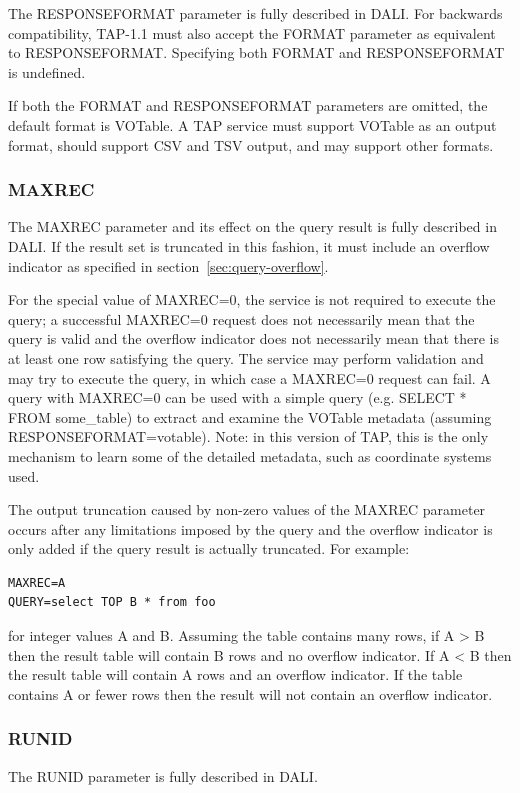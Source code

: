 \documentclass[11pt,letter]{ivoa}
\begin{document}
The RESPONSEFORMAT parameter is fully described in DALI. For 
backwards 
compatibility, TAP-1.1 must also accept the FORMAT parameter as equivalent to 
RESPONSEFORMAT.  
Specifying both FORMAT and RESPONSEFORMAT is undefined.

If both the FORMAT and RESPONSEFORMAT parameters are omitted, the
default format is VOTable.  A TAP service must support VOTable as an
output format, should support CSV and TSV output, and may support other
formats.

\subsubsection{MAXREC}
\label{sec:MAXREC}

The MAXREC parameter and its effect on the query result is fully described in 
DALI. If the result set is truncated in this fashion, it must 
include an overflow indicator as specified in section~\ref{sec:query-overflow}.

For the special value of MAXREC=0, the service is not required to execute the 
query; a successful  MAXREC=0 request does not necessarily mean that the query 
is valid and the overflow indicator does not necessarily mean that there is at 
least one row satisfying the query. The service may perform validation and may 
try to execute the query, in which case a MAXREC=0 request can fail. A query 
with MAXREC=0 can be used with a simple query (e.g. SELECT * FROM  
some\_table) to extract and examine the VOTable metadata (assuming 
RESPONSEFORMAT=votable). Note: in this version of TAP, this is the only mechanism to 
learn some of the detailed metadata, such as coordinate systems used.

The output truncation caused by non-zero values of the MAXREC parameter occurs after any 
limitations imposed by the query and the overflow indicator is only added if 
the query result is actually truncated. For example:

\begin{verbatim}
MAXREC=A
QUERY=select TOP B * from foo
\end{verbatim}

for integer values A and B. Assuming the table contains many rows, if A > B 
then the result table will contain B rows and no overflow indicator. If A < B 
then the result table will contain A rows and an overflow indicator. If the 
table contains A or fewer rows then the result will not contain an overflow 
indicator.

\subsubsection{RUNID}
The RUNID parameter is fully described in DALI.
\end{document}
